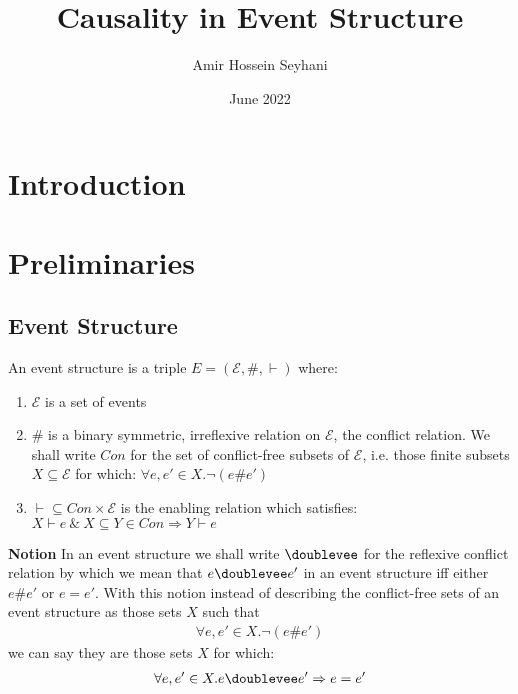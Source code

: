 \documentclass{article}
\title{Causality in Event Structure}
\author{Amir Hossein Seyhani}
\date{June 2022}
\begin{document}
\maketitle

\tableofcontents
\pagebreak

\section{Introduction}

\section{Preliminaries}

\subsection{Event Structure}
\begin{definition}

An event structure is a triple $E = (\mathcal{E},\#,\vdash)$ where:
\begin{enumerate}
    \item $\mathcal{E}$ is a set of events
    \item \# is a binary symmetric, irreflexive relation on $\mathcal{E}$,
    the conflict relation.
    We shall write $Con$ for the set of conflict-free subsets of $\mathcal{E}$,
    i.e. those finite subsets $X \subseteq \mathcal{E}$ for which:
    $\forall e,e' \in X . \neg (e\#e')$
    \item $\vdash \subseteq Con \times \mathcal{E}$ is the enabling relation which satisfies:
    $ X \vdash e \ \& \ X \subseteq Y \in Con \Rightarrow Y \vdash e$
\end{enumerate}

\end{definition}
\textbf{Notion}
In an event structure we shall write $\doublevee$ for the reflexive conflict relation by which we mean
that $e\doublevee e'$ in an event structure iff either $e\#e'$ or $e=e'$.
With this notion instead of describing the conflict-free sets of an event structure
as those sets $X$ such that
\begin{align*}
    \forall e,e' \in X. \neg(e\#e')
\end{align*}
we can say they are those sets $X$ for which:
\begin{align*}
    \forall e,e' \in X. e\doublevee e' \Rightarrow e=e'
\end{align*}
\end{document}
